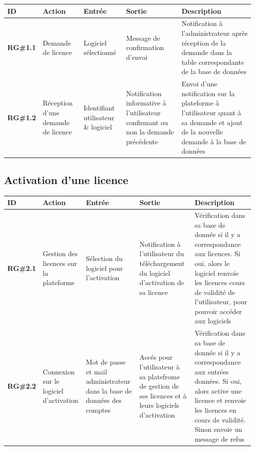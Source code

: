 \begin{table}[!h] %
    \small
    \begin{tabular}{|m{1.5cm}|m{1.9cm}|m{2.5cm}|m{2.5cm}|m{7cm}|}
	\hline
	    \textbf{ID} & \textbf{Action} & \textbf{Entrée} & \textbf{Sortie} & \textbf{Description} \\
	\hline
	    \textbf{RG\#1.1} & Demande de licence & Logiciel sélectionné & Message de confirmation  d'envoi & Notification à l'administrateur après réception de la demande dans la table correspondante de la base de données \\
	\hline
	    \textbf{RG\#1.2} & Réception d'une  demande de  licence & Identifiant utilisateur \& logiciel & Notification informative à l'utilisateur  confirmant ou  non la demande  précédente & Envoi d'une notification sur la plateforme à l'utilisateur quant à sa demande et ajout de la nouvelle demande à la base de données\\
	\hline
    \end{tabular}
\end{table}

\subsection{Activation d'une licence}

\begin{table}[!h] %
    \small
    \begin{tabular}{|m{1.5cm}|m{1.9cm}|m{2.5cm}|m{2.5cm}|m{7cm}|} 
	\hline
	    \textbf{ID} & \textbf{Action} & \textbf{Entrée} & \textbf{Sortie} & \textbf{Description} \\
	\hline
	    \textbf{RG\#2.1} & Gestion des licences sur la plateforme & Sélection du logiciel pour l'activation & Notification à l'utilisateur du téléchargement du logiciel d'activation de sa licence & Vérification dans sa base de donnée si il y a correspondance aux licences. Si oui, alors le logiciel renvoie les licences cours de validité de l'utilisateur, pour pouvoir accéder aux logiciels \\ 
	\hline
	    \textbf{RG\#2.2} & Connexion sur  le logiciel  d'activation &  Mot de passe et mail administrateur dans la base de données des comptes & Accés pour l'utilisateur à sa platefrome de gestion de ses licences et à leurs logiciels d'activation & Vérification dans sa base de donnée si il y a correspondance aux entrées données. Si oui, alors active une licence et renvoie les licences en cours de validité. Sinon envoie un message de refus \\ 
	\hline
    \end{tabular}
\end{table}

